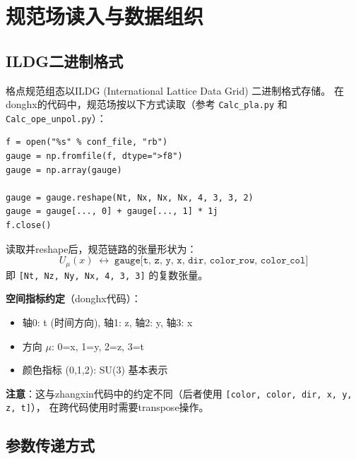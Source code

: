 \documentclass[12pt,a4paper]{ctexart}
\begin{document}
\section{规范场读入与数据组织}

\subsection{ILDG二进制格式}

格点规范组态以ILDG (International Lattice Data Grid) 二进制格式存储。
在donghx的代码中，规范场按以下方式读取（参考 \texttt{Calc\_pla.py} 和 \texttt{Calc\_ope\_unpol.py}）：

\begin{codebox}
\begin{lstlisting}[style=pythonstyle]
f = open("%s" % conf_file, "rb")
gauge = np.fromfile(f, dtype=">f8")
gauge = np.array(gauge)

gauge = gauge.reshape(Nt, Nx, Nx, Nx, 4, 3, 3, 2)
gauge = gauge[..., 0] + gauge[..., 1] * 1j
f.close()
\end{lstlisting}
\end{codebox}

\begin{physbox}[规范场张量结构]
读取并reshape后，规范链路的张量形状为：
\begin{equation}
    U_\mu(x) \;\longleftrightarrow\; \texttt{gauge[t, z, y, x, dir, color\_row, color\_col]}
\end{equation}
即 \texttt{[Nt, Nz, Ny, Nx, 4, 3, 3]} 的复数张量。

\textbf{空间指标约定}（donghx代码）：
\begin{itemize}
    \item 轴0: t (时间方向), 轴1: z, 轴2: y, 轴3: x
    \item 方向 $\mu$: 0=x, 1=y, 2=z, 3=t
    \item 颜色指标 (0,1,2): SU(3) 基本表示
\end{itemize}

\textbf{注意}：这与zhangxin代码中的约定不同（后者使用 \texttt{[color, color, dir, x, y, z, t]}），
在跨代码使用时需要transpose操作。
\end{physbox}

\subsection{参数传递方式}
\end{document}
